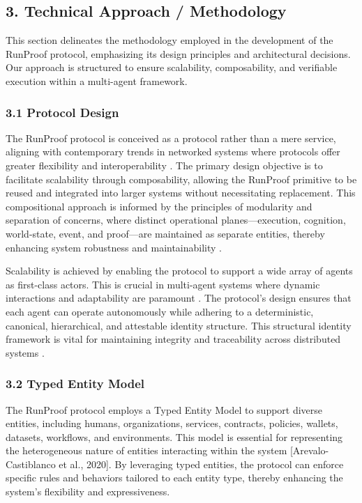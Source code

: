 \documentclass[11pt]{article}
\begin{document}
\subsection{3. Technical Approach / Methodology}

This section delineates the methodology employed in the development of the RunProof protocol, emphasizing its design principles and architectural decisions. Our approach is structured to ensure scalability, composability, and verifiable execution within a multi-agent framework.

\subsubsection{3.1 Protocol Design}

The RunProof protocol is conceived as a protocol rather than a mere service, aligning with contemporary trends in networked systems where protocols offer greater flexibility and interoperability \cite{Guezouri2010}. The primary design objective is to facilitate scalability through composability, allowing the RunProof primitive to be reused and integrated into larger systems without necessitating replacement. This compositional approach is informed by the principles of modularity and separation of concerns, where distinct operational planes—execution, cognition, world-state, event, and proof—are maintained as separate entities, thereby enhancing system robustness and maintainability \cite{Li2025}.

Scalability is achieved by enabling the protocol to support a wide array of agents as first-class actors. This is crucial in multi-agent systems where dynamic interactions and adaptability are paramount \cite{Zhu2022}. The protocol's design ensures that each agent can operate autonomously while adhering to a deterministic, canonical, hierarchical, and attestable identity structure. This structural identity framework is vital for maintaining integrity and traceability across distributed systems \cite{Moslemi2026}.

\subsubsection{3.2 Typed Entity Model}

The RunProof protocol employs a Typed Entity Model to support diverse entities, including humans, organizations, services, contracts, policies, wallets, datasets, workflows, and environments. This model is essential for representing the heterogeneous nature of entities interacting within the system [Arevalo-Castiblanco et al., 2020]. By leveraging typed entities, the protocol can enforce specific rules and behaviors tailored to each entity type, thereby enhancing the system's flexibility and expressiveness.
\end{document}
